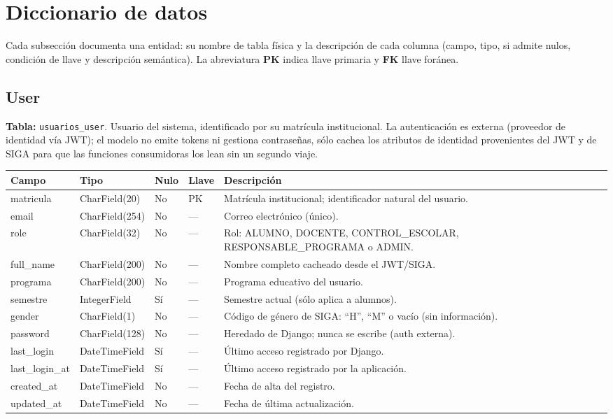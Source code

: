 \documentclass[12pt,letterpaper]{report}
\begin{document}
\chapter{Diccionario de datos}

Cada subsección documenta una entidad: su nombre de tabla física y la
descripción de cada columna (campo, tipo, si admite nulos, condición de llave y
descripción semántica). La abreviatura \textbf{PK} indica llave primaria y
\textbf{FK} llave foránea.

\section{User}

\textbf{Tabla:} \texttt{usuarios\_user}. Usuario del sistema, identificado por
su matrícula institucional. La autenticación es externa (proveedor de identidad
vía JWT); el modelo no emite tokens ni gestiona contraseñas, sólo cachea los
atributos de identidad provenientes del JWT y de SIGA para que las funciones
consumidoras los lean sin un segundo viaje.

\begin{longtable}{L{2.9cm} L{2.6cm} C{1.0cm} C{1.0cm} L{6.6cm}}
\toprule
\textbf{Campo} & \textbf{Tipo} & \textbf{Nulo} & \textbf{Llave} & \textbf{Descripción} \\
\midrule
\endhead
matricula & CharField(20) & No & PK & Matrícula institucional; identificador natural del usuario. \\
email & CharField(254) & No & --- & Correo electrónico (único). \\
role & CharField(32) & No & --- & Rol: ALUMNO, DOCENTE, CONTROL\_ESCOLAR, RESPONSABLE\_PROGRAMA o ADMIN. \\
full\_name & CharField(200) & No & --- & Nombre completo cacheado desde el JWT/SIGA. \\
programa & CharField(200) & No & --- & Programa educativo del usuario. \\
semestre & IntegerField & Sí & --- & Semestre actual (sólo aplica a alumnos). \\
gender & CharField(1) & No & --- & Código de género de SIGA: ``H'', ``M'' o vacío (sin información). \\
password & CharField(128) & No & --- & Heredado de Django; nunca se escribe (auth externa). \\
last\_login & DateTimeField & Sí & --- & Último acceso registrado por Django. \\
last\_login\_at & DateTimeField & Sí & --- & Último acceso registrado por la aplicación. \\
created\_at & DateTimeField & No & --- & Fecha de alta del registro. \\
updated\_at & DateTimeField & No & --- & Fecha de última actualización. \\
\bottomrule
\end{longtable}
\end{document}
